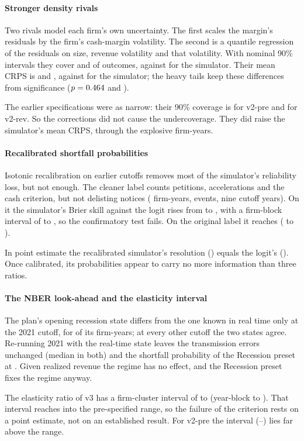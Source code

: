 \paragraph{Stronger density rivals} Two rivals model each firm's own uncertainty. The first scales the margin's residuals by the firm's cash-margin volatility. The second is a quantile regression of the residuals on size, revenue volatility and that volatility. With nominal 90\% intervals they cover \PDenCovHet{} and \PDenCovQr{} of outcomes, against \PDenCovTwin{} for the simulator. Their mean CRPS is \PDenCrpsHet{} and \PDenCrpsQr, against \PDenCrpsTwin{} for the simulator; the heavy tails keep these differences from significance ($p=0.464$ and \PDenQrP).

The earlier specifications were as narrow: their 90\% coverage is \PDenCovVtwopre{} for v2-pre and \PDenCovVtworev{} for v2-rev. So the corrections did not cause the undercoverage. They did raise the simulator's mean CRPS, through the explosive firm-years.

\paragraph{Recalibrated shortfall probabilities} Isotonic recalibration on earlier cutoffs removes most of the simulator's reliability loss, but not enough. The cleaner label counts petitions, accelerations and the cash criterion, but not delisting notices (\PShortLtwoN{} firm-years, \PShortLtwoEv{} events, nine cutoff years). On it the simulator's Brier skill against the logit rises from \PShortLtwoRaw{} to \PShortLtwoRecal, with a firm-block interval of \PShortLtwoLo{} to \PShortLtwoHi, so the confirmatory test fails. On the original label it reaches \PShortLoneRecal{} (\PShortLoneLo{} to \PShortLoneHi).

In point estimate the recalibrated simulator's resolution (\PShortLtwoRes) equals the logit's (\PShortLtwoResLogit). Once calibrated, its probabilities appear to carry no more information than three ratios.

\paragraph{The NBER look-ahead and the elasticity interval} The plan's opening recession state differs from the one known in real time only at the 2021 cutoff, for \PNberDiffer{} of its \PNberN{} firm-years; at every other cutoff the two states agree. Re-running 2021 with the real-time state leaves the transmission errors unchanged (median \PNberMed{} in both) and the shortfall probability of the Recession preset at \PNberShort. Given realized revenue the regime has no effect, and the Recession preset fixes the regime anyway.

The elasticity ratio of v3 has a firm-cluster interval of \PElVthreeFirmLo{} to \PElVthreeFirmHi{} (year-block \PElVthreeYearLo{} to \PElVthreeYearHi). That interval reaches into the pre-specified range, so the failure of the criterion rests on a point estimate, not on an established result. For v2-pre the interval (\PElVtwopreFirmLo--\PElVtwopreFirmHi) lies far above the range.
